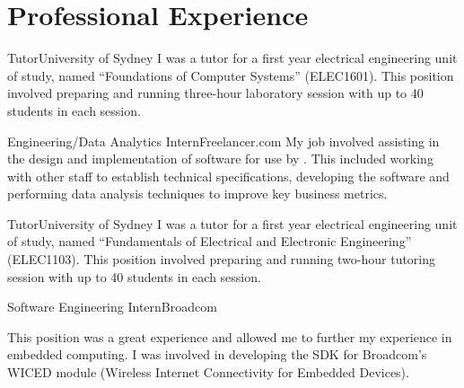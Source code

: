 \documentclass[10pt]{article}
\begin{document}
%
\section*{Professional Experience}
\begin{professionalExperience}

{Tutor}{University of Sydney}
{I was a tutor for a first year electrical engineering unit of study, named 
``Foundations of Computer Systems'' (ELEC1601). This position involved preparing
and running three-hour laboratory session with up to 40 students in each 
session.}
{}

{Engineering/Data Analytics Intern}{Freelancer.com}
{My job involved assisting in the design and implementation of software for use
by . This included working with other staff to establish
technical specifications, developing the software and performing data analysis 
techniques to improve key business metrics.}
{
    
    
    
}

{Tutor}{University of Sydney}
{I was a tutor for a first year electrical engineering unit of study, named 
``Fundamentals of Electrical and Electronic Engineering'' (ELEC1103). This 
position involved preparing and running two-hour tutoring session with up to 40 
students in each session.}
{}

{Software Engineering Intern}{Broadcom}
{This position was a great experience and allowed me to further my experience in
embedded computing. I was involved in developing the SDK for Broadcom's WICED 
module (Wireless Internet Connectivity for Embedded Devices).

}
\end{professionalExperience}
\end{document}

